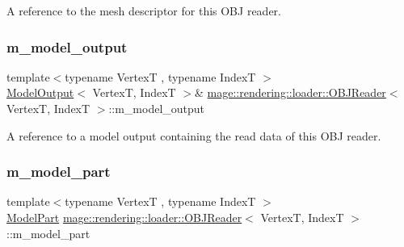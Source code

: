 A reference to the mesh descriptor for this O\+BJ reader. \mbox{\label{classmage_1_1rendering_1_1loader_1_1_o_b_j_reader_a645fca7c3f7f9860cb879f4088c4f8fc}} 
\subsubsection{\texorpdfstring{m\+\_\+model\+\_\+output}{m\_model\_output}}
{\footnotesize\ttfamily template$<$typename VertexT , typename IndexT $>$ \\
\mbox{\hyperlink{structmage_1_1rendering_1_1_model_output}{Model\+Output}}$<$ VertexT, IndexT $>$\& \mbox{\hyperlink{classmage_1_1rendering_1_1loader_1_1_o_b_j_reader}{mage\+::rendering\+::loader\+::\+O\+B\+J\+Reader}}$<$ VertexT, IndexT $>$\+::m\+\_\+model\+\_\+output\hspace{0.3cm}{\ttfamily [private]}}

A reference to a model output containing the read data of this O\+BJ reader. \mbox{\label{classmage_1_1rendering_1_1loader_1_1_o_b_j_reader_a964d90188a9ced3003b5aa3a9b82602b}} 
\subsubsection{\texorpdfstring{m\+\_\+model\+\_\+part}{m\_model\_part}}
{\footnotesize\ttfamily template$<$typename VertexT , typename IndexT $>$ \\
\mbox{\hyperlink{structmage_1_1rendering_1_1_model_part}{Model\+Part}} \mbox{\hyperlink{classmage_1_1rendering_1_1loader_1_1_o_b_j_reader}{mage\+::rendering\+::loader\+::\+O\+B\+J\+Reader}}$<$ VertexT, IndexT $>$\+::m\+\_\+model\+\_\+part\hspace{0.3cm}{\ttfamily [private]}}

